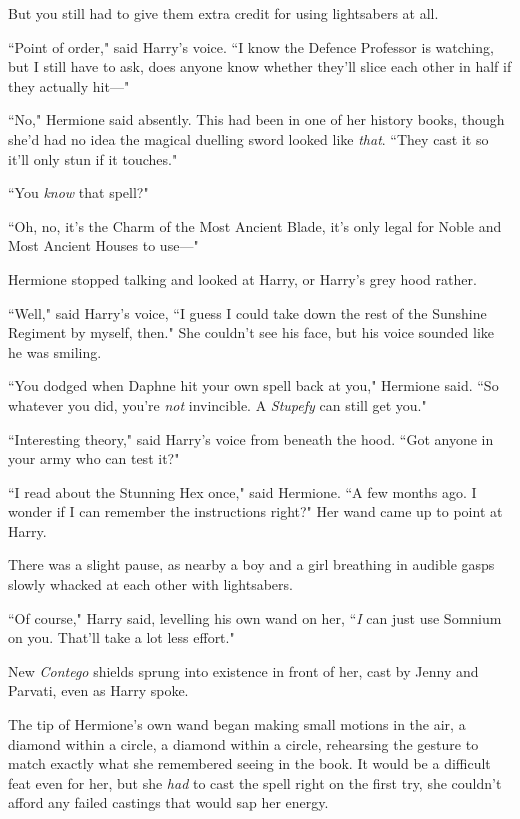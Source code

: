 But you still had to give them extra credit for using lightsabers at all.

``Point of order," said Harry's voice. ``I know the Defence Professor is watching, but I still have to ask, does anyone know whether they'll slice each other in half if they actually hit—"

``No," Hermione said absently. This had been in one of her history books, though she'd had no idea the magical duelling sword looked like \emph{that}. ``They cast it so it'll only stun if it touches."

``You \emph{know} that spell?"

``Oh, no, it's the Charm of the Most Ancient Blade, it's only legal for Noble and Most Ancient Houses to use—"

Hermione stopped talking and looked at Harry, or Harry's grey hood rather.

``Well," said Harry's voice, ``I guess I could take down the rest of the Sunshine Regiment by myself, then." She couldn't see his face, but his voice sounded like he was smiling.

``You dodged when Daphne hit your own spell back at you," Hermione said. ``So whatever you did, you're \emph{not} invincible. A \emph{Stupefy} can still get you."

``Interesting theory," said Harry's voice from beneath the hood. ``Got anyone in your army who can test it?"

``I read about the Stunning Hex once," said Hermione. ``A few months ago. I wonder if I can remember the instructions right?" Her wand came up to point at Harry.

There was a slight pause, as nearby a boy and a girl breathing in audible gasps slowly whacked at each other with lightsabers.

``Of course," Harry said, levelling his own wand on her, ``\emph{I} can just use Somnium on you. That'll take a lot less effort."

New \emph{Contego} shields sprung into existence in front of her, cast by Jenny and Parvati, even as Harry spoke.

The tip of Hermione's own wand began making small motions in the air, a diamond within a circle, a diamond within a circle, rehearsing the gesture to match exactly what she remembered seeing in the book. It would be a difficult feat even for her, but she \emph{had} to cast the spell right on the first try, she couldn't afford any failed castings that would sap her energy.


